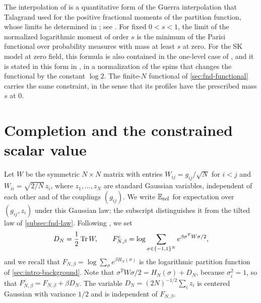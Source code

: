 The interpolation of \cite[Section~2]{AL} is a quantitative form of the
Guerra interpolation that Talagrand used for the positive fractional
moments of the partition function, whose limits he determined in
\cite{Talagrand2007FractionalMoments}; see \cite[Section~1.2]{AL}. For
fixed $0<s<1$, the limit of the normalized logarithmic moment of order
$s$ is the minimum of the Parisi functional over probability measures
with mass at least $s$ at zero. For the SK model at zero field, this
formula is also contained in the one-level case of
\cite[Theorem~2.1]{ContucciMingione2019}, and it is stated in this form
in \cite[Theorem~2.1]{ChenEtAl2026LargeDeviations}, in a normalization
of the spins that changes the functional by the constant $\log2$. The
finite-$N$ functional of \cref{sec:fnd-functional} carries the same
constraint, in the sense that its profiles have the
prescribed mass $s$ at $0$.

\section{Completion and the constrained scalar value}
\label{sec:fnd-completion}

Let $W$ be the symmetric $N\times N$ matrix with entries
$W_{ij}=g_{ij}/\sqrt N$ for $i<j$ and $W_{ii}=\sqrt{2/N}\,z_i$, where
$z_1,\ldots,z_N$ are standard Gaussian variables, independent of each
other and of the couplings $(g_{ij})$. We write $\mathbb E_{\rm ref}$ for
expectation over $(g_{ij},z_i)$ under this Gaussian law; the subscript
distinguishes it from the tilted law of \cref{subsec:fnd-law}.
Following \cite[Section~1.1]{AL}, we set
\[
 D_N=\frac12\operatorname{Tr} W,\qquad
 F^c_{N,\beta}=\log\sum_{\sigma\in\{-1,1\}^N}e^{\beta\sigma^TW\sigma/2},
\]
and we recall that $F_{N,\beta}=\log\sum_\sigma e^{\beta H_N(\sigma)}$ is the
logarithmic partition function of \cref{sec:intro-background}. Note that
$\sigma^TW\sigma/2=H_N(\sigma)+D_N$, because $\sigma_i^2=1$, so that
$F^c_{N,\beta}=F_{N,\beta}+\beta D_N$. The variable
$D_N=(2N)^{-1/2}\sum_iz_i$ is centered Gaussian with variance $1/2$ and
is independent of $F_{N,\beta}$.

